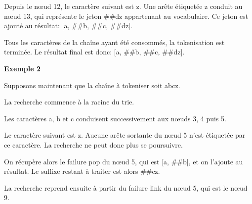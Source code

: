 \documentclass[12pt,a4paper]{report}
\begin{document}
\begin{figure}[H]
		
	\end{figure}
	
	Depuis le nœud 12, le caractère suivant est z. Une arête étiquetée z conduit au nœud 13, qui représente le jeton \#\#dz appartenant au vocabulaire. Ce jeton est ajouté au résultat: [a, \#\#b, \#\#c, \#\#dz].
	
	Tous les caractères de la chaîne ayant été consommés, la tokenisation est terminée. Le résultat final est donc: [a, \#\#b, \#\#c, \#\#dz].
	
	\textbf{Exemple 2}
	
	Supposons maintenant que la chaîne à tokeniser soit abcz.
	
	La recherche commence à la racine du trie.
	
	Les caractères a, b et c conduisent successivement aux nœuds 3, 4 puis 5.
	
	Le caractère suivant est z. Aucune arête sortante du nœud 5 n'est étiquetée par ce caractère. La recherche ne peut donc plus se poursuivre.
	
	On récupère alors le failure pop du nœud 5, qui est [a, \#\#b], et on l'ajoute au résultat. Le suffixe restant à traiter est alors \#\#cz.
	
	La recherche reprend ensuite à partir du failure link du nœud 5, qui est le nœud 9.
	
\end{document}
